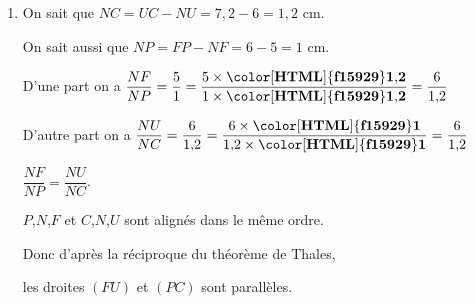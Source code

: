 \begin{corrige}
    \phantom{rrr}

    \begin{enumerate}
        \item \begin{spacing}{1.5}
            \begin{minipage}{0.3\linewidth}
            \end{minipage}
            \hfill
            \begin{minipage}{.65\linewidth} 
                On sait que $NC=UC-NU=7{,}2-6=1{,}2$ cm.

                On sait aussi que $NP=FP-NF=6-5=1$ cm.
                
                D'une part on a $\dfrac{NF}{NP}=\dfrac{5}{1}=\dfrac{5\times\mathbf{{\color[HTML]{f15929}1{,}2}}}{1\times\mathbf{{\color[HTML]{f15929}1{,}2}}}=\dfrac{6}{1{,}2}$

                D'autre part on a $\dfrac{NU}{NC}=\dfrac{6}{1{,}2}=\dfrac{6\times\mathbf{{\color[HTML]{f15929}1}}}{1{,}2\times\mathbf{{\color[HTML]{f15929}1}}}=\dfrac{6}{1{,}2}$
                
                $\dfrac{NF}{NP}=\dfrac{NU}{NC}$.
                
                $P$,$N$,$F$ et $C$,$N$,$U$ sont alignés dans le même ordre.
                
                Donc d'après la réciproque du théorème de Thales,
                
                les droites $(FU)$ et $(PC)$ sont parallèles.                
            \end{minipage}
 

\end{spacing}
\end{enumerate}
\end{corrige}
